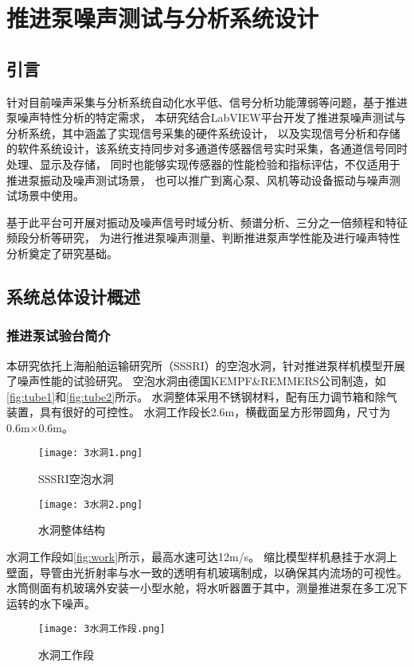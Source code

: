 \chapter{推进泵噪声测试与分析系统设计}
\section{引言}
针对目前噪声采集与分析系统自动化水平低、信号分析功能薄弱等问题，基于推进泵噪声特性分析的特定需求，
本研究结合LabVIEW平台开发了推进泵噪声测试与分析系统，其中涵盖了实现信号采集的硬件系统设计，
以及实现信号分析和存储的软件系统设计，该系统支持同步对多通道传感器信号实时采集，各通道信号同时处理、显示及存储，
同时也能够实现传感器的性能检验和指标评估，不仅适用于推进泵振动及噪声测试场景，
也可以推广到离心泵、风机等动设备振动与噪声测试场景中使用。

基于此平台可开展对振动及噪声信号时域分析、频谱分析、三分之一倍频程和特征频段分析等研究，
为进行推进泵噪声测量、判断推进泵声学性能及进行噪声特性分析奠定了研究基础。

\section{系统总体设计概述}
\subsection{推进泵试验台简介}
本研究依托上海船舶运输研究所（SSSRI）的空泡水洞，针对推进泵样机模型开展了噪声性能的试验研究。
空泡水洞由德国KEMPF\&REMMERS公司制造，如\autoref{fig:tube1}和\autoref{fig:tube2}所示。
水洞整体采用不锈钢材料，配有压力调节箱和除气装置，具有很好的可控性。
水洞工作段长2.6m，横截面呈方形带圆角，尺寸为0.6m×0.6m。
\begin{figure}[htbp]
    \centering
    \texttt{[image: 3水洞1.png]}
    \caption{\label{fig:tube1}SSSRI空泡水洞}
\end{figure}
\begin{figure}[htbp]
    \centering
    \texttt{[image: 3水洞2.png]}
    \caption{\label{fig:tube2}水洞整体结构}
\end{figure}

水洞工作段如\autoref{fig:work}所示，最高水速可达12m/s。
缩比模型样机悬挂于水洞上壁面，导管由光折射率与水一致的透明有机玻璃制成，以确保其内流场的可视性。
水筒侧面有机玻璃外安装一小型水舱，将水听器置于其中，测量推进泵在多工况下运转的水下噪声。
\begin{figure}[htbp]
    \centering
    \texttt{[image: 3水洞工作段.png]}
    \caption{\label{fig:work}水洞工作段}
\end{figure}

